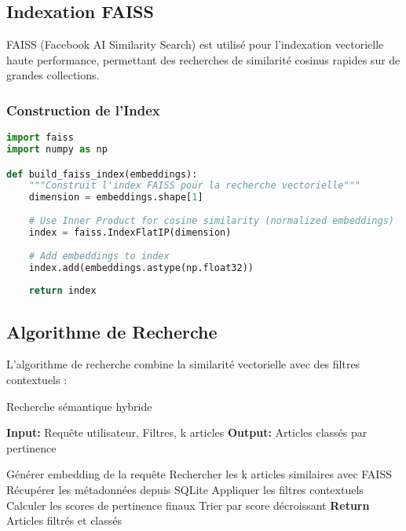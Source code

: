 \documentclass[12pt,a4paper]{article}
\begin{document}
\subsection{Indexation FAISS}

FAISS (Facebook AI Similarity Search) \cite{faiss} est utilisé pour l'indexation vectorielle haute performance, permettant des recherches de similarité cosinus rapides sur de grandes collections.

\subsubsection{Construction de l'Index}

\begin{lstlisting}[language=Python, caption=Construction de l'index FAISS]
import faiss
import numpy as np

def build_faiss_index(embeddings):
    """Construit l'index FAISS pour la recherche vectorielle"""
    dimension = embeddings.shape[1]
    
    # Use Inner Product for cosine similarity (normalized embeddings)
    index = faiss.IndexFlatIP(dimension)
    
    # Add embeddings to index
    index.add(embeddings.astype(np.float32))
    
    return index
\end{lstlisting}

\subsection{Algorithme de Recherche}

L'algorithme de recherche combine la similarité vectorielle avec des filtres contextuels :

\begin{algorithm}[H]
\caption{Recherche sémantique hybride}
\begin{algorithmic}[1]
\STATE \textbf{Input:} Requête utilisateur, Filtres, k articles
\STATE \textbf{Output:} Articles classés par pertinence

\STATE Générer embedding de la requête
\STATE Rechercher les k articles similaires avec FAISS
\STATE Récupérer les métadonnées depuis SQLite
\STATE Appliquer les filtres contextuels
\STATE Calculer les scores de pertinence finaux
\STATE Trier par score décroissant
\STATE \textbf{Return} Articles filtrés et classés
\end{algorithmic}
\end{algorithm}
\end{document}
